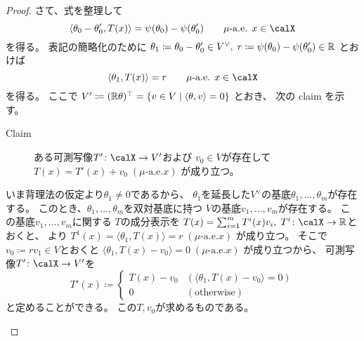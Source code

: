 \documentclass[report]{jlreq}
\begin{document}
\begin{proof}
    さて、式を整理して
    \begin{equation}
        \langle \theta_0 - \theta_0', T(x) \rangle
            = \psi(\theta_0) - \psi(\theta_0')
            \qquad
            \text{$\mu$-a.e. $x \in \calX$}
    \end{equation}
    を得る。
    表記の簡略化のために
    $\theta_1 \coloneqq \theta_0 - \theta_0' \in V^\vee, \;
        r \coloneqq \psi(\theta_0) - \psi(\theta_0') \in \mathbb{R}$
    とおけば
    \begin{equation}
        \locallabel{eq:costant-pairing}
        \langle \theta_1, T(x) \rangle
            = r
            \qquad
            \text{$\mu$-a.e. $x \in \calX$}
    \end{equation}
    を得る。
    ここで
    $V' \coloneqq (\mathbb{R}\theta)^\top = \{ v \in V \mid \langle \theta, v \rangle = 0 \}$
    とおき、
    次の claim を示す。
    \begin{description}
        \item[Claim] ある可測写像$T' \colon \calX \to V'$および
            $v_0 \in V$が存在して
            $T(x) = T'(x) + v_0 \; (\text{$\mu$-a.e.$x$})$
            が成り立つ。
    \end{description}
    \begin{innerproof}
        いま背理法の仮定より$\theta_1 \neq 0$であるから、
        $\theta_1$を延長した$V^\vee$の基底$\theta_1, \dots, \theta_m$が存在する。
        このとき、$\theta_1, \dots, \theta_m$を双対基底に持つ
        $V$の基底$v_1, \dots, v_m$が存在する。
        この基底$v_1, \dots, v_m$に関する
        $T$の成分表示を
        $T(x) = \sum_{i = 1}^m T^i(x) v_i, \;
            T^i \colon \calX \to \R$とおくと、
        より
        $T^1(x) = \langle \theta_1, T(x) \rangle = r \; (\text{$\mu$-a.e.$x$})$
        が成り立つ。
        そこで$v_0 \coloneqq rv_1 \in V$とおくと
        $\langle \theta_1, T(x) - v_0 \rangle = 0 \; (\text{$\mu$-a.e.$x$})$
        が成り立つから、
        可測写像$T' \colon \calX \to V'$を
        \begin{equation}
            T'(x) \coloneqq \begin{cases}
                T(x) - v_0 & (\langle \theta_1, T(x) - v_0 \rangle = 0) \\
                0 & (\text{otherwise})
            \end{cases}
        \end{equation}
        と定めることができる。
        この$T, v_0$が求めるものである。
    \end{innerproof}

\end{proof}
\end{document}
